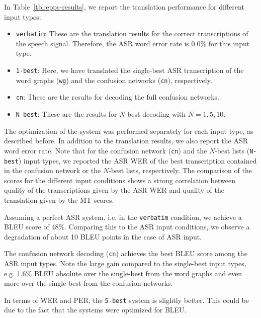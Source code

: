 \documentclass[11pt]{report}
\theoremstyle{plain}
\begin{document}
{In Table~\ref{tbl:epps-results}, we report the translation performance for different input types:
\begin{itemize}
\item {\tt verbatim}: These are the translation results for the correct transcriptions of the speech signal. Therefore, the ASR word error rate is 0.0\% for this input type.
\item {\tt 1-best}: Here, we have translated the single-best ASR transcription of the word graphs ({\tt wg}) and the confusion networks ({\tt cn}), respectively.
\item {\tt cn}: These are the results for decoding the full confusion networks.
\item {\tt N-best}: These are the results for $N$-best decoding with $N=1,5,10$.
\end{itemize}
The optimization of the system was performed separately for each input type, as described before.
In addition to the translation results, we also report the ASR word error rate.
Note that for the confusion network ({\tt cn}) and the $N$-best lists ({\tt N-best}) input types,  we reported the ASR WER of the best transcription contained in the confusion network or the $N$-best lists, respectively.
The comparison of the scores for the different input conditions %
shows a strong correlation between quality of the transcriptions given by the ASR WER and quality of the translation given by the MT scores.

Assuming a perfect ASR system, i.e. in the {\tt verbatim} condition, we achieve a BLEU score of 48\%.
Comparing this to the ASR input conditions, we observe a degradation of about 10 BLEU points in the case of ASR input.

The confusion network decoding ({\tt cn}) achieves the best BLEU score among the ASR input types. %
Note the large gain compared to the single-best input types, e.g. 1.6\% BLEU absolute over the single-best from the word graphs and even more over the single-best from the confusion networks.

In terms of WER and PER, the {\tt 5-best} system is slightly better.
This could be due to the fact that the systems were optimized for BLEU.

}
\end{document}
